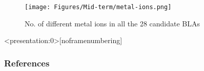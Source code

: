 \documentclass[aspectratio=169,draft]{beamer}
\begin{document}
\begin{frame}{}
    \begin{figure}[!htbp]
          \centering
          \texttt{[image: Figures/Mid-term/metal-ions.png]}
          \vspace*{-1mm}
          \caption{No. of different metal ions in all the 28 candidate BLAs}
    \end{figure}
\end{frame}




\begin{frame}<presentation:0>[noframenumbering]

{\cite{Fukugita-1998} \cite{Shull} \cite{cen-ostriker-1999} \cite{tepper-2013} \cite{savage-2014} \cite{danforth-2016} \cite{acharya_khaire}}
    
\end{frame}
    



\begin{frame}
\renewcommand{\bibfont}{\footnotesize}
\frametitle{\huge{\textbf{References}}}




\end{frame}


\end{document}
